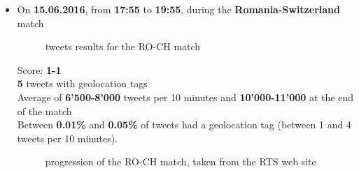 \documentclass[a4paper,11pt]{report}
\begin{document}
\begin{itemize}
	\item On \textbf{15.06.2016}, from \textbf{17:55} to \textbf{19:55}, during the \textbf{Romania-Switzerland} match
	\begin{figure}[H]
	\vspace{-5pt}
	\begin{center}
	\vspace{-5pt}
	\caption{tweets results for the RO-CH match}
	\end{center}
	\end{figure}
	\vspace{-20pt}
	Score: \textbf{1-1}\\
	\textbf{5} tweets with geolocation tags\\
	Average of \textbf{6'500-8'000} tweets per 10 minutes and \textbf{10'000-11'000} at the end of the match\\
	Between \textbf{0.01\%} and \textbf{0.05\%} of tweets had a geolocation tag (between 1 and 4 tweets per 10 minutes).
	\begin{figure}[H]
	\vspace{-5pt}
	\begin{center}
	\vspace{-5pt}
	\caption{progression of the RO-CH match, taken from the RTS web site}
	\end{center}
	\end{figure}
	\vspace{-20pt}
	

\end{itemize}
\end{document}

